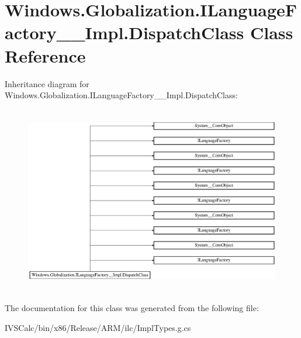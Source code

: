 \hypertarget{class_windows_1_1_globalization_1_1_i_language_factory_____impl_1_1_dispatch_class}{}\section{Windows.\+Globalization.\+I\+Language\+Factory\+\_\+\+\_\+\+Impl.\+Dispatch\+Class Class Reference}
\label{class_windows_1_1_globalization_1_1_i_language_factory_____impl_1_1_dispatch_class}
Inheritance diagram for Windows.\+Globalization.\+I\+Language\+Factory\+\_\+\+\_\+\+Impl.\+Dispatch\+Class\+:\begin{figure}[H]
\begin{center}
\leavevmode
\includegraphics[height=8.257373cm]{class_windows_1_1_globalization_1_1_i_language_factory_____impl_1_1_dispatch_class}
\end{center}
\end{figure}


The documentation for this class was generated from the following file\+:\begin{DoxyCompactItemize}
\item 
I\+V\+S\+Calc/bin/x86/\+Release/\+A\+R\+M/ilc/Impl\+Types.\+g.\+cs\end{DoxyCompactItemize}
